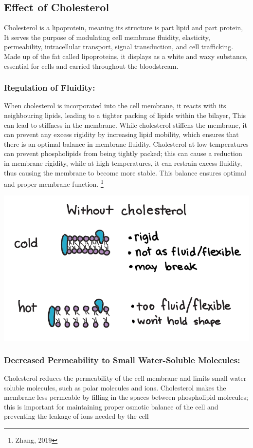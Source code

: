\documentclass[a4paper,12pt,twoside,english]{all-in-one} %
\begin{document}
\subsection{Effect of Cholesterol}
Cholesterol is a lipoprotein, meaning its structure is part lipid and part protein, It serves the purpose of modulating cell membrane fluidity, elasticity, permeability, intracellular transport, signal transduction, and cell trafficking. Made up of the fat called lipoproteins, it displays as a white and waxy substance, essential for cells and carried throughout the bloodstream. 

\subsubsection{Regulation of Fluidity:}
When cholesterol is incorporated into the cell membrane, it reacts with its neighbouring lipids, leading to a tighter packing of lipids within the bilayer, This can lead to stiffness in the membrane. While cholesterol stiffens the membrane, it can prevent any excess rigidity by increasing lipid mobility, which ensures that there is an optimal balance in membrane fluidity. Cholesterol at low temperatures can prevent phospholipids from being tightly packed; this can cause a reduction in membrane rigidity, while at high temperatures, it can restrain excess fluidity, thus causing the membrane to become more stable. This balance ensures optimal and proper membrane function.  \footnote{Zhang, 2019}

\includegraphics[scale=0.6]{images/6.png}

\subsubsection{Decreased Permeability to Small Water-Soluble Molecules:
}
Cholesterol reduces the permeability of the cell membrane and limits small water-soluble molecules, such as polar molecules and ions. Cholesterol makes the membrane less permeable by filling in the spaces between phospholipid molecules; this is important for maintaining proper osmotic balance of the cell and preventing the leakage of ions needed by the cell
\end{document}
